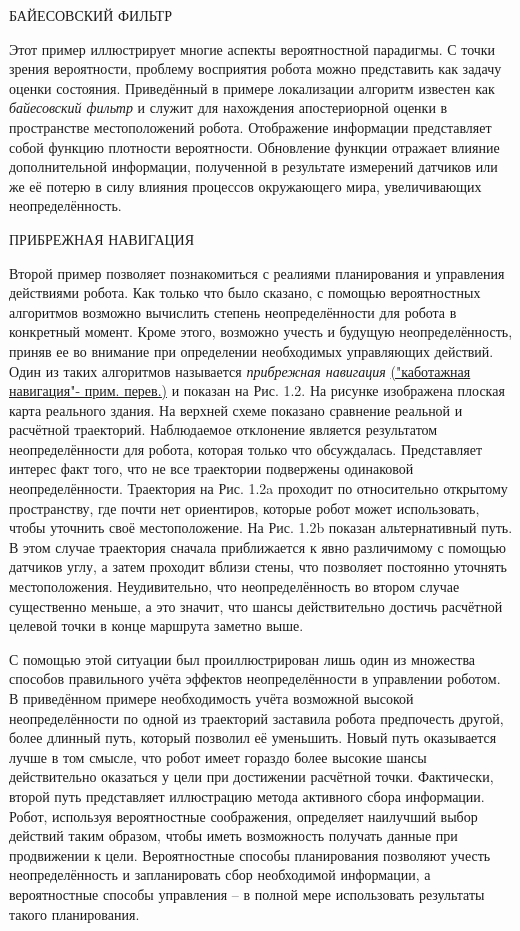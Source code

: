 \documentclass[10pt,a4paper]{article}
\begin{document}
БАЙЕСОВСКИЙ ФИЛЬТР
 
Этот пример иллюстрирует многие аспекты вероятностной парадигмы. С точки зрения вероятности, проблему восприятия робота можно представить как задачу оценки состояния. Приведённый в примере локализации алгоритм известен как \textit{байесовский фильтр} и служит для нахождения апостериорной оценки в пространстве местоположений робота. Отображение информации представляет собой функцию плотности вероятности. Обновление функции отражает влияние дополнительной информации, полученной в результате измерений датчиков или же её потерю в силу влияния процессов окружающего мира, увеличивающих неопределённость.

ПРИБРЕЖНАЯ НАВИГАЦИЯ

Второй пример позволяет познакомиться с реалиями планирования и управления действиями робота. Как только что было сказано, с помощью вероятностных алгоритмов возможно вычислить степень неопределённости для робота в конкретный момент. Кроме этого, возможно учесть и будущую неопределённость, приняв ее во внимание при определении необходимых управляющих действий. Один из таких алгоритмов называется \textit{прибрежная навигация} \underline{("каботажная навигация"- прим. перев.)} и показан на Рис. 1.2. На рисунке изображена плоская карта реального здания. На верхней схеме показано сравнение реальной и расчётной траекторий. Наблюдаемое отклонение является результатом неопределённости для робота, которая только что обсуждалась. Представляет интерес факт того, что не все траектории подвержены одинаковой неопределённости. Траектория на Рис. 1.2a проходит по относительно открытому пространству, где почти нет ориентиров, которые робот может использовать, чтобы уточнить своё местоположение. На Рис. 1.2b показан альтернативный путь. В этом случае траектория сначала приближается к явно различимому с помощью датчиков углу, а затем проходит вблизи стены, что позволяет постоянно уточнять местоположения. Неудивительно, что неопределённость во втором случае существенно меньше, а это значит, что шансы действительно достичь расчётной целевой точки в конце маршрута заметно выше.

С помощью этой ситуации был проиллюстрирован лишь один из множества способов правильного учёта эффектов неопределённости в управлении роботом. В приведённом примере необходимость учёта возможной высокой неопределённости по одной из траекторий заставила робота предпочесть другой, более длинный путь, который позволил её уменьшить. Новый путь оказывается лучше в том смысле, что робот имеет гораздо более высокие шансы действительно оказаться у цели при достижении расчётной точки. Фактически, второй путь представляет иллюстрацию метода активного сбора информации. Робот, используя вероятностные соображения, определяет наилучший выбор действий таким образом, чтобы иметь возможность получать данные при продвижении к цели. Вероятностные способы планирования позволяют учесть неопределённость и запланировать сбор необходимой информации, а вероятностные способы управления – в полной мере использовать результаты такого планирования.\\
\end{document}
